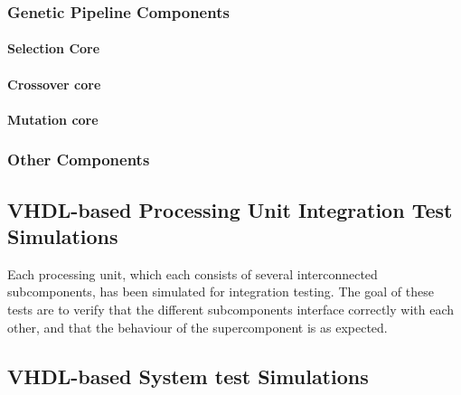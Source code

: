 



\subsubsection{Genetic Pipeline Components}
\paragraph{Selection Core}


\paragraph{Crossover core}





\paragraph{Mutation core}



\subsubsection{Other Components}

\subsection{\gls{VHDL}-based Processing Unit Integration Test Simulations}

Each processing unit, which each consists of several interconnected subcomponents, has been simulated for integration testing.
The goal of these tests are to verify that the different subcomponents interface correctly with each other, and that the behaviour of the supercomponent is as expected.


\subsection{\gls{VHDL}-based System test Simulations}
\label{section:testing:fpga:system-tests}

